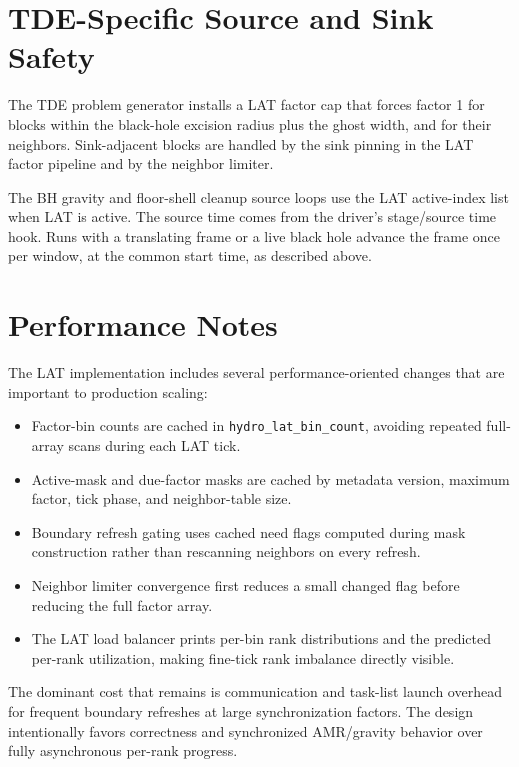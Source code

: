 \documentclass[11pt]{article}
\begin{document}
\section{TDE-Specific Source and Sink Safety}

The TDE problem generator installs a LAT factor cap that forces factor 1 for
blocks within the black-hole excision radius plus the ghost width, and for
their neighbors.  Sink-adjacent blocks are handled by the sink pinning in the
LAT factor pipeline and by the neighbor limiter.

The BH gravity and floor-shell cleanup source loops use the LAT active-index
list when LAT is active.  The source time comes from the driver's stage/source
time hook.  Runs with a translating frame or a live black hole advance the frame
once per window, at the common start time, as described above.

\section{Performance Notes}

The LAT implementation includes several performance-oriented changes that are
important to production scaling:
\begin{itemize}
  \item Factor-bin counts are cached in \texttt{hydro\_lat\_bin\_count},
        avoiding repeated full-array scans during each LAT tick.
  \item Active-mask and due-factor masks are cached by metadata version,
        maximum factor, tick phase, and neighbor-table size.
  \item Boundary refresh gating uses cached need flags computed during mask
        construction rather than rescanning neighbors on every refresh.
  \item Neighbor limiter convergence first reduces a small changed flag before
        reducing the full factor array.
  \item The LAT load balancer prints per-bin rank distributions and the
        predicted per-rank utilization, making fine-tick rank imbalance
        directly visible.
\end{itemize}

The dominant cost that remains is communication and task-list launch overhead
for frequent boundary refreshes at large synchronization factors.  The design
intentionally favors correctness and synchronized AMR/gravity behavior over
fully asynchronous per-rank progress.
\end{document}
